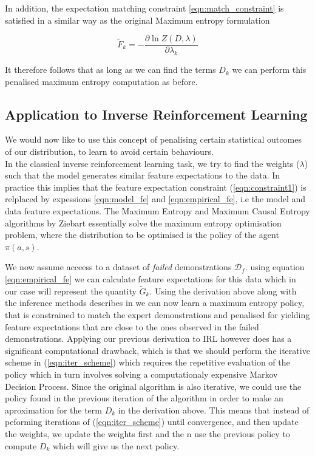 \documentclass[letterpaper]{article}
\begin{document}
In addition, the expectation matching constraint \ref{eqn:match_constraint} is satisfied in a similar way as the original 
Maximum entropy formulation

\begin{equation}
	\widetilde{F}_k = -\frac{\partial\ln Z(D,\lambda)}{\partial\lambda_k}
\end{equation}

It therefore follows that as long as we can find the terms $D_k$ we can perform 
this penalised maximum entropy computation as before.

\subsection{Application to Inverse Reinforcement Learning}
We would now like to use this concept of penalising certain 
statistical outcomes of our distribution, to learn to avoid certain behaviours.\\ 
In the classical inverse reinforcement learning task, we try to find the
weights ($\lambda$) such that the model generates similar feature expectations to the 
data. In practice this implies that the feature expectation constraint (\ref{eqn:constraint1}) is relplaced by expessions
\ref{eqn:model_fe} and \ref{eqn:empirical_fe}, i.e the model and data feature expectations. The Maximum Entropy and Maximum Causal Entropy algorithms by Ziebart
essentially solve the maximum entropy optimisation problem, where the distribution to be optimised
is the policy of the agent $\pi(a,s)$.

We now assume acceess to a dataset of \emph{failed} demonstrations $\mathcal{D}_f$.
using equation \ref{eqn:empirical_fe} we can calculate feature expectations for this data
which in our case will represent the quantity $\widetilde{G}_k$. Using the derivation above along with the
inference methods describes in \cite{ziebart2010modelingthesis} we can now learn a maximum entropy policy, that is 
constrained to match the expert demonstrations and penalised for yielding feature expectations that are close
to the ones observed in the failed demonstrations. Applying our previous derivation to IRL however does
has a significant computational drawback, which is that we should perform the iterative scheme in (\ref{eqn:iter_scheme})
which requires the repetitive evaluation of the policy which in turn involves solving a computationaly expensive Markov Decision Process. Since the original algorithm is also iterative, we could use the policy found in the
previous iteration of the algorithm in order to make an aproximation for the term $D_k$ in the derivation above. This means that
instead of peforming iterations of (\ref{eqn:iter_scheme}) until convergence, and then update the weights, we update the weights first
and the n use the previous policy to compute $D_k$ which will give us the next policy.
\end{document}
